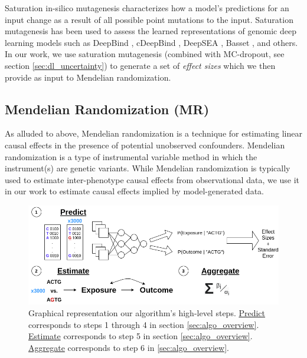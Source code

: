 \documentclass{article}
\begin{document}
Saturation in-silico mutagenesis characterizes how a model's predictions for an input change as a result of all possible point mutations to the input. Saturation mutagenesis has been used to assess the learned representations of genomic deep learning models such as DeepBind \cite{alipanahi2015predicting}, cDeepBind \cite{gandhi2018cdeepbind}, DeepSEA \cite{zhou2015predicting}, Basset \cite{kelley2016basset}, and others. In our work, we use saturation mutagenesis (combined with MC-dropout, see section \ref{sec:dl_uncertainty}) to generate a set of \textit{effect sizes} which we then provide as input to Mendelian randomization.

\subsection{Mendelian Randomization (MR)}
As alluded to above, Mendelian randomization is a technique for estimating linear causal effects in the presence of potential unobserved confounders. Mendelian randomization is a type of instrumental variable method in which the instrument(s) are genetic variants. While Mendelian randomization is typically used to estimate inter-phenotype causal effects from observational data, we use it in our work to estimate causal effects implied by model-generated data.

\begin{figure}[htpb]
    \centering
    \includegraphics[width=.8\linewidth]{fig/model_overview.png}
    \caption{Graphical representation our algorithm's high-level steps. \underline{Predict} corresponds to steps 1 through 4 in section \ref{sec:algo_overview}. \underline{Estimate} corresponds to step 5 in section \ref{sec:algo_overview}. \underline{Aggregate} corresponds to step 6 in \ref{sec:algo_overview}.}
    \label{fig:model_overview}
\end{figure}
\end{document}
